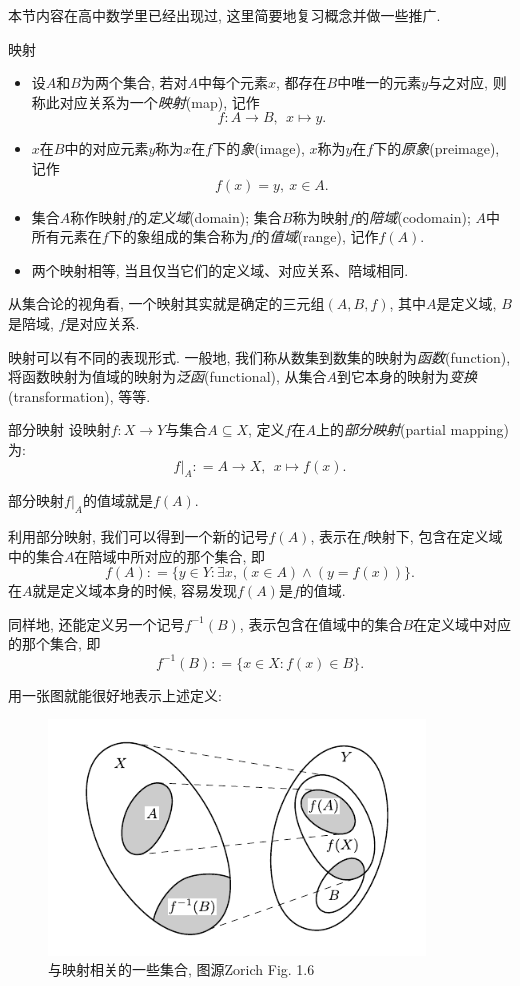本节内容在高中数学里已经出现过, 这里简要地复习概念并做一些推广.

\begin{definition}{映射}
	\vspace{-2em}
	\begin{itemize}
		\item 设$A$和$B$为两个集合, 若对$A$中每个元素$x$, 都存在$B$中唯一的元素$y$与之对应, 则称此对应关系为一个\textit{映射}(map), 记作$$f: A \to B, ~~x \mapsto y.$$
		\item $x$在$B$中的对应元素$y$称为$x$在$f$下的\textit{象}(image), $x$称为$y$在$f$下的\textit{原象}(preimage), 记作$$f(x) = y, ~ x \in A.$$
		\item 集合$A$称作映射$f$的\textit{定义域}(domain); 集合$B$称为映射$f$的\textit{陪域}(codomain); $A$中所有元素在$f$下的象组成的集合称为$f$的\textit{值域}(range), 记作$f(A)$.
		\item 两个映射相等, 当且仅当它们的定义域、对应关系、陪域相同.
	\end{itemize}
\end{definition}

从集合论的视角看, 一个映射其实就是确定的三元组$(A, B, f)$, 其中$A$是定义域, $B$是陪域, $f$是对应关系.

映射可以有不同的表现形式. 一般地, 我们称从数集到数集的映射为\textit{函数}(function), 将函数映射为值域的映射为\textit{泛函}(functional), 从集合$A$到它本身的映射为\textit{变换}(transformation), 等等. 

\begin{definition}{部分映射}
	设映射$f: X \to Y$与集合$A \subseteq X$, 定义$f$在$A$上的\textit{部分映射}(partial mapping)为: $$f|_A : = A \to X, ~~x \mapsto f(x).$$
\end{definition}
\begin{remark}
	部分映射$f|_A$的值域就是$f(A)$.
\end{remark}

利用部分映射, 我们可以得到一个新的记号$f(A)$, 表示在$f$映射下, 包含在定义域中的集合$A$在陪域中所对应的那个集合, 即$$f(A) : = \{ y \in Y: \exists x,  (x \in A) \wedge (y=f(x)) \}.$$
在$A$就是定义域本身的时候, 容易发现$f(A)$是$f$的值域.

同样地, 还能定义另一个记号$f^{-1}(B)$, 表示包含在值域中的集合$B$在定义域中对应的那个集合, 即$$f^{-1}(B) : = \{ x \in X: f(x) \in B \}.$$

用一张图就能很好地表示上述定义: 

\begin{figure}[h!]
	\centering
	\includegraphics[width=10cm]{attachment/Acr1745354698752707434.pdf}
	\caption{与映射相关的一些集合, 图源Zorich Fig. 1.6}
\end{figure}

